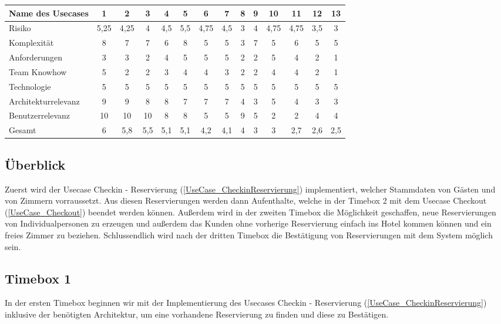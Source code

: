 \begin{tabular} { | l | c c c c c c c c c c c c c | }
	\hline
	Name des Usecases & 1 & 2 & 3 & 4 & 5 & 6 & 7 & 8 & 9 & 10 & 11 & 12 & 13 \\ \hline
	Risiko & 5,25 &	4,25 & 4 & 4,5 & 5,5 & 4,75 & 4,5 & 3 & 4 & 4,75 & 4,75 & 3,5 & 3\\
	Komplexität & 8 & 7 & 7 & 6 & 8 & 5 & 5 & 3 & 7 & 5 & 6 & 5 & 5\\
	Anforderungen & 3 & 3 & 2 & 4 & 5 & 5 & 5 & 2 & 2 & 5 & 4 & 2 & 1\\
	Team Knowhow & 5 & 2 & 2 & 3 & 4 & 4 & 3 & 2 & 2 & 4 & 4 & 2 & 1\\
	Technologie & 5 & 5 & 5 & 5 & 5 & 5 & 5 & 5  & 5 & 5 & 5 & 5 & 5\\
	\hline
	Architekturrelevanz	& 9 & 9 & 8 & 8 & 7 & 7 & 7 & 4 & 3 & 5 & 4 & 3 & 3\\
	Benutzerrelevanz & 10 & 10 & 10 & 8 & 8 & 5 & 5 & 9 & 5 & 2 & 2 & 4 & 4 \\
	\hline \hline
	Gesamt & 6 & 5,8 & 5,5 & 5,1 & 5,1 & 4,2 & 4,1 & 4 & 3 & 3 & 2,7 & 2,6 & 2,5\\
\hline
\end{tabular}



\subsection{Überblick}
Zuerst wird der Usecase Checkin - Reservierung (\ref{UseCase_CheckinReservierung}) implementiert, welcher Stammdaten von Gästen und von Zimmern vorraussetzt.
Aus diesen Reservierungen werden dann Aufenthalte, welche in der Timebox 2 mit dem Usecase Checkout (\ref{UseCase_Checkout}) beendet werden können.
Außerdem wird in der zweiten Timebox die Möglichkeit geschaffen, neue \Gls{Reservierung}en von Individualpersonen zu erzeugen und außerdem
das Kunden ohne vorherige \Gls{Reservierung} einfach ins Hotel kommen können und ein freies Zimmer zu beziehen.
Schlussendlich wird nach der dritten Timebox die Bestätigung von Reservierungen mit dem System möglich sein.

\subsection{Timebox 1}
In der ersten Timebox beginnen wir mit der Implementierung des Usecases Checkin - Reservierung (\ref{UseCase_CheckinReservierung}) inklusive der benötigten Architektur,
um eine vorhandene Reservierung zu finden und diese zu Bestätigen.

